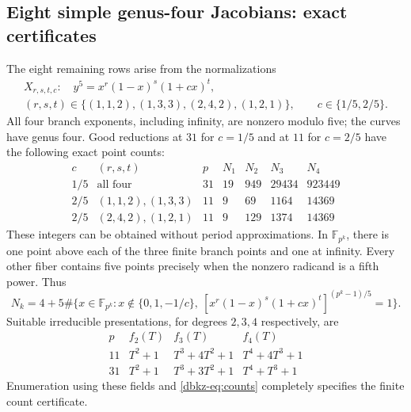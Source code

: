 \documentclass[11pt,a4paper]{article}
\theoremstyle{definition}
\theoremstyle{remark}
\numberwithin{equation}{section}
\begin{document}
\subsection{Eight simple genus-four Jacobians: exact certificates}
\label{dbkz-sec:simple}
The eight remaining rows arise from the normalizations
\[
\begin{gathered}
 X_{r,s,t,c}:\quad y^5=x^r(1-x)^s(1+cx)^t,\\
 (r,s,t)\in\{(1,1,2),(1,3,3),(2,4,2),(1,2,1)\},
 \qquad c\in\{1/5,2/5\}.
\end{gathered}
\]
All four branch exponents, including infinity, are nonzero modulo five;
the curves have genus four. Good reductions at $31$ for $c=1/5$ and
at $11$ for $c=2/5$ have the following exact point counts:
\[
\begin{array}{c|c|r|rrrr}
c&(r,s,t)&p&N_1&N_2&N_3&N_4\\\hline
1/5&\text{all four}&31&19&949&29434&923449\\
2/5&(1,1,2),(1,3,3)&11&9&69&1164&14369\\
2/5&(2,4,2),(1,2,1)&11&9&129&1374&14369
\end{array}
\]
These integers can be obtained without period approximations. In
$\mathbb F_{p^k}$, there is one point above each of the three finite
branch points and one at infinity. Every other fiber contains five
points precisely when the nonzero radicand is a fifth power. Thus
\begin{equation}\label{dbkz-eq:counts}
 N_k=4+5\#\{x\in\mathbb F_{p^k}:x\notin\{0,1,-1/c\},\
 [x^r(1-x)^s(1+cx)^t]^{(p^k-1)/5}=1\}.
\end{equation}
Suitable irreducible presentations, for degrees $2,3,4$ respectively,
are
\[
\begin{array}{c|ccc}
p&f_2(T)&f_3(T)&f_4(T)\\\hline
11&T^2+1&T^3+4T^2+1&T^4+4T^3+1\\
31&T^2+1&T^3+3T^2+1&T^4+T^3+1
\end{array}
\]
Enumeration using these fields and \eqref{dbkz-eq:counts} completely
specifies the finite count certificate.
\end{document}
